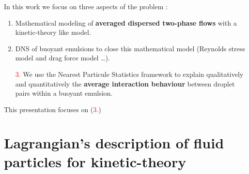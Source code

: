 \documentclass{sintefbeamer}
\begin{document}
\begin{frame}
  {In this work we focus on three aspects of the problem :}
  \Large
  \begin{enumerate}
    \item Mathematical modeling of \textbf{averaged dispersed two-phase flows} with a kinetic-theory like model. 

    \item DNS of buoyant emulsions to close this mathematical model (Reynolds stress model and drag force model \ldots). 
    \item[\textcolor{red}{3.}] We use the Nearest Particule Statistics framework to explain qualitatively and quantitatively the \textbf{average interaction behaviour} between droplet pairs within a buoyant emulsion. 
  \end{enumerate}
  This presentation focuses on (\textcolor{red}{3.})
\end{frame}



\section{Lagrangian's description of fluid particles for kinetic-theory}
\section*{}
\end{document}
